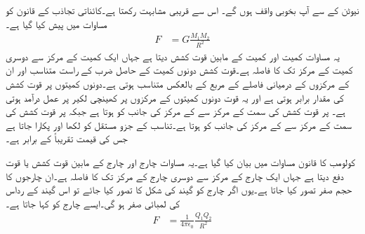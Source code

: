 نیوٹن کے  سے آپ بخوبی واقف ہوں گے۔ اس سے قریبی مشابہت رکھتا ہے۔کائناتی تجاذب کے قانون کو مساوات  میں پیش کیا گیا ہے۔
\begin{align}\label{مساوات_کولوم_کشش_ثقل}
F&=G \frac{M_1 M_2}{R^2}
\end{align}
یہ مساوات کمیت  اور کمیت  کے مابین قوت کشش  دیتا ہے جہاں ایک کمیت کے مرکز سے دوسری کمیت کے مرکز تک کا فاصلہ  ہے۔قوت کشش دونوں کمیت کے حاصل ضرب کے  راست متناسب اور ان کے مرکزوں کے درمیانی فاصلے  کے مربع کے بالعکس متناسب ہوتی ہے۔دونوں کمیتوں پر قوت کشش کی مقدار برابر ہوتی ہے اور یہ قوت دونوں کمیتوں کے  مرکزوں پر کھینچی لکیر پر عمل درآمد ہوتی ہے۔ پر قوت کشش کی سمت  کے مرکز سے  کے مرکز کی جانب کو ہوتا ہے جبکہ  پر قوت کشش کی سمت  کے مرکز سے  کے مرکز کی جانب کو ہوتا ہے۔تناسب کے جزو مستقل کو  لکھا اور  پکارا جاتا ہے جس کی قیمت تقریباً  کے برابر ہے۔

کولومب کا قانون مساوات  میں بیان کیا گیا ہے۔یہ مساوات چارج  اور چارج  کے مابین قوت کشش یا قوت دفع  دیتا ہے جہاں ایک چارج کے مرکز سے دوسری چارج کے مرکز تک کا فاصلہ  ہے۔ان چارجوں کا حجم صفر تصور کیا جاتا ہے۔یوں اگر چارج کو گیند کی شکل کا تصور کیا جائے تو اس گیند کے رداس  کی لمبائی صفر ہو گی۔ایسے چارج کو  کہا جاتا ہے۔
\begin{align}\label{مساوات_کولوم_کولومب_کشش_چارج}
F&=\frac{1}{4 \pi \epsilon_0}\frac{Q_1 Q_2}{ R^2}
\end{align}

